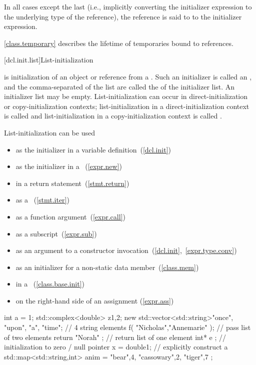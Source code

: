 In all cases except the last
(i.e., implicitly converting the initializer expression
to the underlying type of the reference),
the reference is said to  to the
initializer expression.

\pnum
\begin{note}
\ref{class.temporary} describes the lifetime of temporaries bound to references.
\end{note}

[dcl.init.list]{List-initialization}%

\pnum
{} is initialization of an object or reference from a
. Such an initializer is called an , and the comma-separated  of the list are
called the  of the initializer list. An initializer list may be empty.
List-initialization can occur in direct-initialization or copy-initialization contexts;
list-initialization in a direct-initialization context is called
 and list-initialization in a
copy-initialization context is called . \begin{note}
List-initialization can be used

\begin{itemize}
\item as the initializer in a variable definition~(\ref{dcl.init})
\item as the initializer in a ~(\ref{expr.new})
\item in a return statement~(\ref{stmt.return})
\item as a ~(\ref{stmt.iter})
\item as a function argument~(\ref{expr.call})
\item as a subscript~(\ref{expr.sub})
\item as an argument to a constructor invocation~(\ref{dcl.init},~\ref{expr.type.conv})
\item as an initializer for a non-static data member~(\ref{class.mem})
\item in a ~(\ref{class.base.init})
\item on the right-hand side of an assignment (\ref{expr.ass})
\end{itemize}

\begin{example}
\begin{codeblock}
int a = {1};
std::complex<double> z{1,2};
new std::vector<std::string>{"once", "upon", "a", "time"};  // 4 string elements
f( {"Nicholas","Annemarie"} );  // pass list of two elements
return { "Norah" };             // return list of one element
int* e {};                      // initialization to zero / null pointer
x = double{1};                  // explicitly construct a 
std::map<std::string,int> anim = { {"bear",4}, {"cassowary",2}, {"tiger",7} };
\end{codeblock}
\end{example} \end{note}

